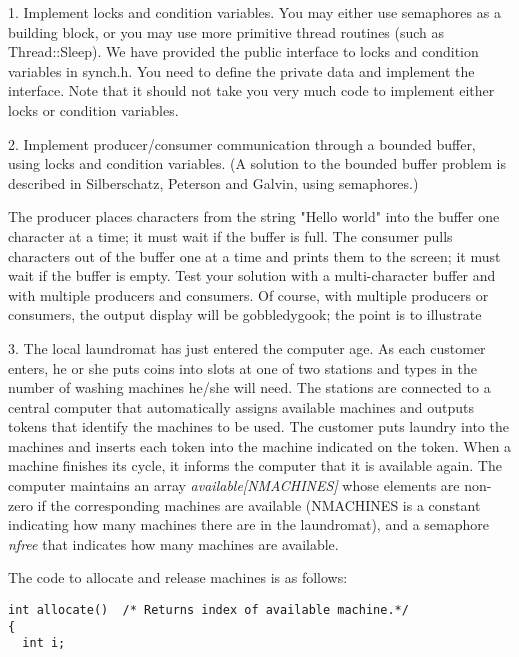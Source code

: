 \begin{description}

\item{1.}
Implement locks and condition variables.  You may either use semaphores
as a building block, or you may use more primitive thread routines (such
as Thread::Sleep).  We have provided the public interface to locks
and condition variables in synch.h.  You need to define the private
data and implement the interface.  Note that it should not take you very
much code to implement either locks or condition variables.

\item{2.}
Implement producer/consumer communication through a bounded buffer,
using locks and condition variables.  (A solution to the bounded buffer
problem is described in Silberschatz, Peterson and Galvin, using
semaphores.)

The producer places characters from the string "Hello world" into the
buffer one character at a time; it must wait if the buffer is full.
The consumer pulls characters out of the buffer one at a time
and prints them to the screen; it must wait if the buffer is empty.
Test your solution with a multi-character buffer and with multiple
producers and consumers.  Of course, with multiple producers or consumers,
the output display will be gobbledygook; the point is to illustrate

\item{3.} The local laundromat has just entered the computer age.
As each customer enters, he or she puts coins into
slots at one of two stations and types in
the number of washing machines he/she will need.  The stations
are connected to a central computer that
automatically assigns available machines and outputs
tokens that identify the machines to be used.  The
customer puts laundry into the machines and inserts each
token into the machine indicated on the token.  When a machine finishes
its cycle, it informs the computer that it is available again.
The computer maintains an array {\em available[NMACHINES]} whose elements are
non-zero if the corresponding machines are available (NMACHINES is
a constant indicating how many machines there are in the
laundromat), and a semaphore {\em nfree} that indicates how many
machines are available.

The code to allocate and release machines is as follows:

\begin{verbatim}
int allocate()	/* Returns index of available machine.*/
{
  int i;


\end{verbatim}
\end{description}
